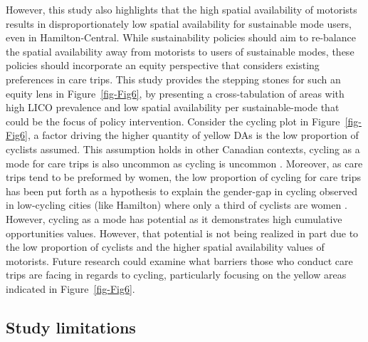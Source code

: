 \documentclass[
  authoryear,
  preprint,
  3p]{elsarticle}
\begin{document}
However, this study also highlights that the high spatial availability
of motorists results in disproportionately low spatial availability for
sustainable mode users, even in Hamilton-Central. While sustainability
policies should aim to re-balance the spatial availability away from
motorists to users of sustainable modes, these policies should
incorporate an equity perspective that considers existing preferences in
care trips. This study provides the stepping stones for such an equity
lens in Figure~\ref{fig-Fig6}, by presenting a cross-tabulation of areas
with high LICO prevalence and low spatial availability per
sustainable-mode that could be the focus of policy intervention.
Consider the cycling plot in Figure~\ref{fig-Fig6}, a factor driving the
higher quantity of yellow DAs is the low proportion of cyclists assumed.
This assumption holds in other Canadian contexts, cycling as a mode for
care trips is also uncommon as cycling is uncommon
\citep{ravensbergenExploratoryAnalysisMobility2022}. Moreover, as care
trips tend to be preformed by women, the low proportion of cycling for
care trips has been put forth as a hypothesis to explain the gender-gap
in cycling observed in low-cycling cities (like Hamilton) where only a
third of cyclists are women
\citep{ravensbergenFeministGeographiesCycling2019, prati2018gender}.
However, cycling as a mode has potential as it demonstrates high
cumulative opportunities values. However, that potential is not being
realized in part due to the low proportion of cyclists and the higher
spatial availability values of motorists. Future research could examine
what barriers those who conduct care trips are facing in regards to
cycling, particularly focusing on the yellow areas indicated in
Figure~\ref{fig-Fig6}.

\subsection{Study limitations}\label{study-limitations}
\end{document}
